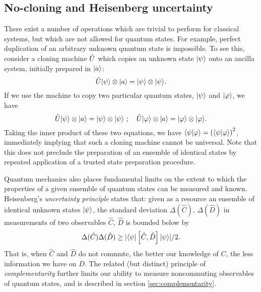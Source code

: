 \subsection{No-cloning and Heisenberg uncertainty}
\label{sec:no-cloning}
There exist a number of operations which are trivial to perform for classical systems, but which are not allowed for quantum states.
For example, perfect duplication of an arbitrary unknown quantum state is impossible. To see this, consider a cloning machine $\hat{U}$ which copies an unknown state $\mbox{$ | \psi \rangle $}$ onto an ancilla system, initially prepared in $\mbox{$ | a \rangle $}$: 
\begin{equation}
   \hat{U} \mbox{$ | \psi \rangle $} \otimes \mbox{$ | a \rangle $} = \mbox{$ | \psi \rangle $} \otimes \mbox{$ | \psi \rangle $}.
\end{equation}
If we use the machine to copy two particular quantum states, $\mbox{$ | \psi \rangle $}$ and $\mbox{$ | \varphi \rangle $}$, we have
\begin{equation}
   \hat{U} \mbox{$ | \psi \rangle $} \otimes \mbox{$ | a \rangle $} = \mbox{$ | \psi \rangle $} \otimes \mbox{$ | \psi \rangle $}~; \quad
   \hat{U} \mbox{$ | \varphi \rangle $} \otimes \mbox{$ | a \rangle $} = \mbox{$ | \varphi \rangle $} \otimes \mbox{$ | \varphi \rangle $}.
\end{equation}
Taking the inner product of these two equations, we have $\langle \psi | \varphi \rangle = \left(\langle \psi | \varphi \rangle\right)^2$, immediately implying that such a cloning machine cannot be universal. Note that this does not preclude the preparation of an ensemble of identical states by repeated application of a trusted state preparation procedure.

Quantum mechanics also places fundamental limits on the extent to which the properties of a given ensemble of quantum states can be measured and known. Heisenberg's \emph{uncertainty principle} states that: given as a resource an ensemble of identical unknown states $\mbox{$ | \psi \rangle $}$, the standard deviation $\Delta (\hat{C})$, $\Delta (\hat{D})$ in measurements of two observables $\hat{C}$, $\hat{D}$ is bounded below by
\begin{equation}
    \Delta(\hat{C}) \Delta(\hat{D}) 
    \ge 
    |\mbox{$ \langle \psi | $} \left[ \hat{C}, \hat{D} \right]\mbox{$ | \psi \rangle $}| / 2 .
\end{equation}
That is, when $\hat{C}$ and $\hat{D}$ do not commute, the better our knowledge of $C$, the less information we have on $D$.  The related (but distinct) principle of \emph{complementarity} further limits our ability to measure noncommuting observables of quantum states, and is described in section \ref{sec:complementarity}.

